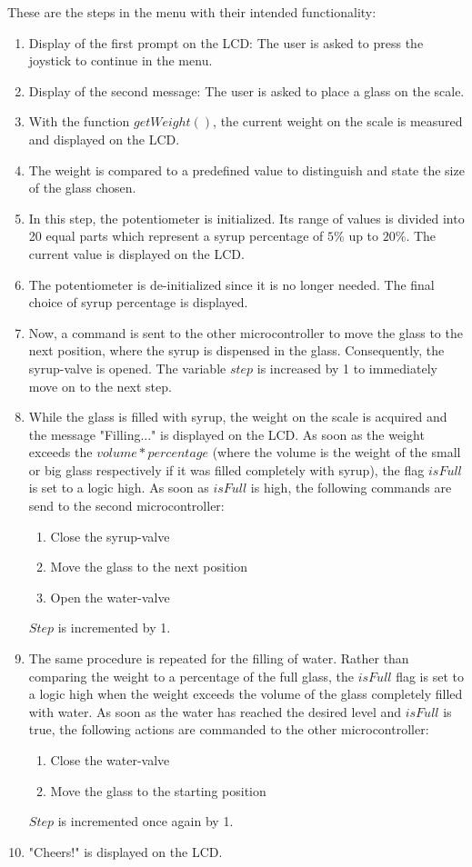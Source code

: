 \documentclass[twocolumn]{article}
\begin{document}
	These are the steps in the menu with their intended functionality:
	
	\begin{enumerate}
		\item Display of the first prompt on the LCD: The user is asked to press the joystick to continue in the menu.
		\item Display of the second message: The user is asked to place a glass on the scale.
		\item With the function $getWeight()$, the current weight on the scale is measured and displayed on the LCD.
		\item The weight is compared to a predefined value to distinguish and state the size of the glass chosen.
		\item In this step, the potentiometer is initialized. Its range of values is divided into 20 equal parts which represent a syrup percentage of $5\%$ up to $20\%$. The current value is displayed on the LCD.
		\item The potentiometer is de-initialized since it is no longer needed. The final choice of syrup percentage is displayed.
		\item Now, a command is sent to the other microcontroller to move the glass to the next position, where the syrup is dispensed in the glass. Consequently, the syrup-valve is opened. The variable $step$ is increased by 1 to immediately move on to the next step.
		\item While the glass is filled with syrup, the weight on the scale is acquired and the message "Filling..." is displayed on the LCD. As soon as the weight exceeds the $volume*percentage$ (where the volume is the weight of the small or big glass respectively if it was filled completely with syrup), the flag $isFull$ is set to a logic high. 
		As soon as $isFull$ is high, the following commands are send to the second microcontroller: 
				
		\newpage
		\vspace*{40px}
		
		\begin{enumerate}
			\item Close the syrup-valve
			\item Move the glass to the next position
			\item Open the water-valve
		\end{enumerate}
		$Step$ is incremented by 1.
		\item The same procedure is repeated for the filling of water. Rather than comparing the weight to a percentage of the full glass, the $isFull$ flag is set to a logic high when the weight exceeds the volume of the glass completely filled with water. As soon as the water has reached the desired level and $isFull$ is true, the following actions are commanded to the other microcontroller:
		\begin{enumerate}
			\item Close the water-valve
			\item Move the glass to the starting position
		\end{enumerate}
		$Step$ is incremented once again by 1.
		\item "Cheers!" is displayed on the LCD.


\end{enumerate}
\end{document}
